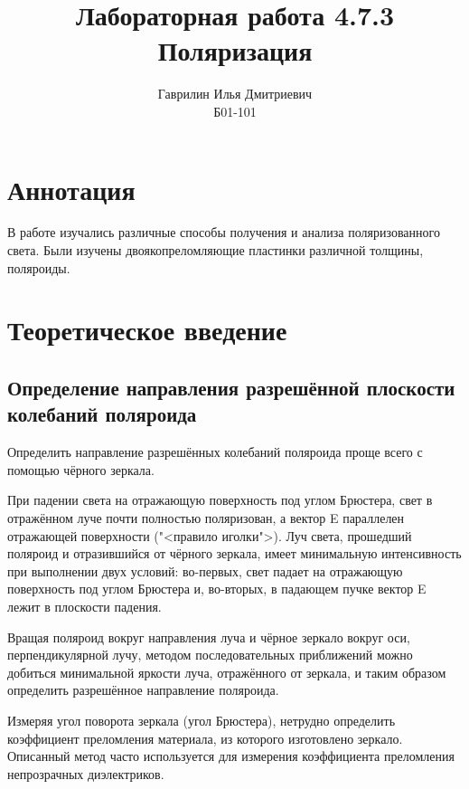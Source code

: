 \documentclass[a4paper, 12pt]{article}%
\author{Гаврилин Илья Дмитриевич \\
	Б01-101}
\title{\textbf{Лабораторная работа 4.7.3\\ 
		Поляризация}}
\begin{document}
	\maketitle
	\section{Аннотация}
	В работе изучались различные способы получения и анализа поляризованного света. Были изучены двоякопреломляющие пластинки различной толщины, поляроиды.
	\section{Теоретическое введение}
	
	\subsection{Определение направления разрешённой плоскости колебаний поляроида}
	
	Определить направление разрешённых колебаний поляроида проще всего с помощью чёрного зеркала.
	
	При падении света на отражающую поверхность под углом Брюстера, свет в отражённом луче почти полностью поляризован, а вектор E
	параллелен отражающей поверхности ("<правило иголки">). Луч света,
	прошедший поляроид и отразившийся от чёрного зеркала, имеет минимальную интенсивность при выполнении двух условий: во-первых, свет
	падает на отражающую поверхность под углом Брюстера и, во-вторых,
	в падающем пучке вектор E лежит в плоскости падения.
	
	Вращая поляроид вокруг направления луча и чёрное зеркало вокруг
	оси, перпендикулярной лучу, методом последовательных приближений
	можно добиться минимальной яркости луча, отражённого от зеркала,
	и таким образом определить разрешённое направление поляроида.
	
	Измеряя угол поворота зеркала (угол Брюстера), нетрудно определить коэффициент преломления материала, из которого изготовлено
	зеркало. Описанный метод часто используется для измерения коэффициента преломления непрозрачных диэлектриков.
	
\end{document}
